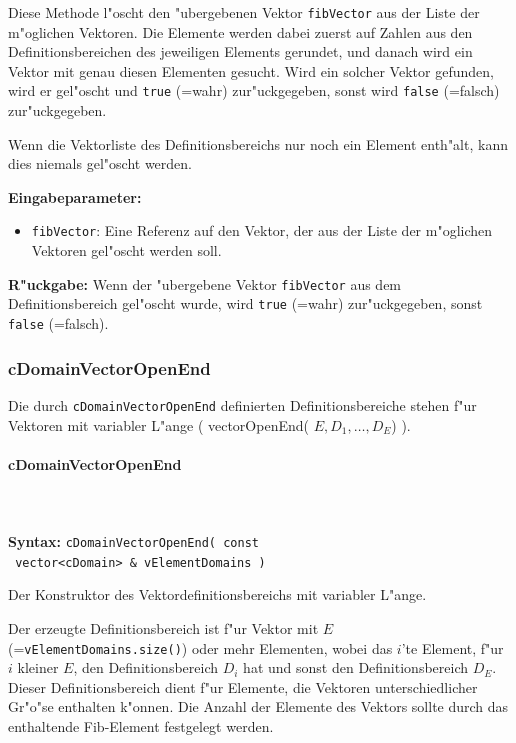 \bigskip\noindent
Diese Methode l"oscht den "ubergebenen Vektor \verb|fibVector| aus der Liste der m"oglichen Vektoren. Die Elemente werden dabei zuerst auf Zahlen aus den Definitionsbereichen des jeweiligen Elements gerundet, und danach wird ein Vektor mit genau diesen Elementen gesucht. Wird ein solcher Vektor gefunden, wird er gel"oscht und \verb|true| (=wahr) zur"uckgegeben, sonst wird \verb|false| (=falsch) zur"uckgegeben.

Wenn die Vektorliste des Definitionsbereichs nur noch ein Element enth"alt, kann dies niemals gel"oscht werden.

\bigskip\noindent
\textbf{Eingabeparameter:}
\begin{itemize}
 \item \verb|fibVector|: Eine Referenz auf den Vektor, der aus der Liste der m"oglichen Vektoren gel"oscht werden soll.
\end{itemize}

\bigskip\noindent
\textbf{R"uckgabe:}  Wenn der "ubergebene Vektor \verb|fibVector| aus dem Definitionsbereich gel"oscht wurde, wird \verb|true| (=wahr) zur"uckgegeben, sonst \verb|false| (=falsch).


\subsubsection{cDomainVectorOpenEnd}

Die durch \verb|cDomainVectorOpenEnd| definierten Definitionsbereiche stehen f"ur Vektoren mit variabler L"ange ( vectorOpenEnd( $E , D_1, \ldots , D_E$) ).

\paragraph{cDomainVectorOpenEnd}

\ \\\\\noindent
\textbf{Syntax:} \verb|cDomainVectorOpenEnd( const| \\\verb| vector<cDomain> & vElementDomains )|

\bigskip\noindent
Der Konstruktor des Vektordefinitionsbereichs mit variabler L"ange.

Der erzeugte Definitionsbereich ist f"ur Vektor mit $E$ (=\verb|vElementDomains.size()|) oder mehr Elementen, wobei das $i$'te Element, f"ur $i$ kleiner $E$, den Definitionsbereich $D_i$ hat und sonst den Definitionsbereich $D_E$. Dieser Definitionsbereich dient f"ur Elemente, die Vektoren unterschiedlicher Gr"o"se enthalten k"onnen. Die Anzahl der Elemente des Vektors sollte durch das enthaltende Fib-Element festgelegt werden.

